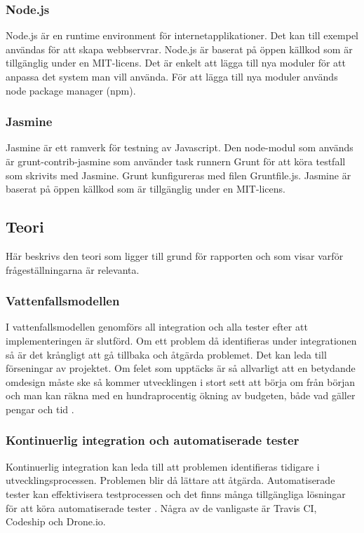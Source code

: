 \subsubsection{Node.js}
Node.js är en runtime environment för internetapplikationer. Det kan till exempel 
användas för att skapa webbservrar.
Node.js är baserat på öppen källkod som är tillgänglig under en MIT-licens. 
Det är enkelt att lägga till nya 
moduler för att anpassa det system man vill
använda. För att lägga till nya moduler används node package manager (npm).

\subsubsection{Jasmine}
Jasmine är ett ramverk för testning av Javascript. 
Den node-modul som används är grunt-contrib-jasmine som använder task runnern Grunt 
för att köra testfall som skrivits med Jasmine.
Grunt kunfigureras med filen Gruntfile.js. Jasmine är baserat på öppen källkod
som är tillgänglig under en MIT-licens.

\subsection{Teori}
Här beskrivs den teori som ligger till grund för rapporten och som visar
varför frågeställningarna är relevanta.

\subsubsection{Vattenfallsmodellen}
I vattenfallsmodellen genomförs all integration och alla tester efter att implementeringen är slutförd. 
Om ett problem då identifieras under integrationen så är det krångligt att gå 
tillbaka och åtgärda problemet. 
Det kan leda till förseningar av projektet.
Om felet som upptäcks är så allvarligt att en betydande omdesign måste ske så
kommer utvecklingen i stort sett att börja om från början och man kan räkna 
med en hundraprocentig ökning av budgeten, 
både vad gäller pengar och tid \cite{Royce}.

\subsubsection{Kontinuerlig integration och automatiserade tester}
Kontinuerlig integration kan leda till att problemen identifieras tidigare i 
utvecklingsprocessen. Problemen blir då lättare att åtgärda. Automatiserade tester kan effektivisera 
testprocessen och det finns många tillgängliga lösningar för att köra automatiserade
tester \cite{Karlsson}.
Några av de vanligaste är Travis CI, Codeship och Drone.io.

